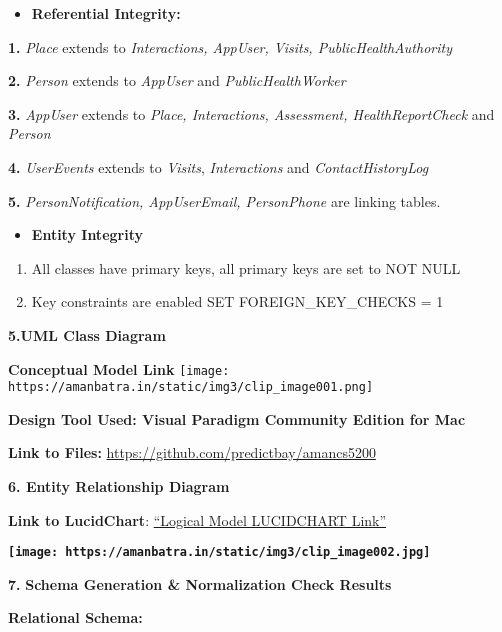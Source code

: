 \documentclass[
]{article}
\providecommand{\tightlist}{%
  \setlength{\itemsep}{0pt}\setlength{\parskip}{0pt}}
\begin{document}
\begin{itemize}
\tightlist
\item
  \textbf{Referential Integrity:}
\end{itemize}

\textbf{1.} \emph{Place} extends to \emph{Interactions, AppUser, Visits,
PublicHealthAuthority}

\textbf{2.} \emph{Person} extends to \emph{AppUser} and
\emph{PublicHealthWorker}

\textbf{3.} \emph{AppUser} extends to \emph{Place, Interactions,
Assessment, HealthReportCheck} and \emph{Person}

\textbf{4.} \emph{UserEvents} extends to \emph{Visits},
\emph{Interactions} and \emph{ContactHistoryLog}

\textbf{5.} \emph{PersonNotification, AppUserEmail, PersonPhone} are
linking tables.

\begin{itemize}
\tightlist
\item
  \textbf{Entity Integrity}
\end{itemize}

\begin{enumerate}
\def\labelenumi{\arabic{enumi}.}
\item
  All classes have primary keys, all primary keys are set to NOT NULL
\item
  Key constraints are enabled SET FOREIGN\_KEY\_CHECKS = 1
\end{enumerate}

\textbf{5.UML Class Diagram}

\textbf{Conceptual Model Link}
\texttt{[image: https://amanbatra.in/static/img3/clip\_image001.png]}

\textbf{Design Tool Used: Visual Paradigm Community Edition for Mac}

\textbf{Link to Files:} \url{https://github.com/predictbay/amancs5200}

\textbf{6. Entity Relationship Diagram}

\textbf{Link to LucidChart}:
\href{https://app.lucidchart.com/documents/view/982d3b7d-538a-4993-9511-126f0853bb6e/0_0}{``Logical
Model LUCIDCHART Link''}

\textbf{\texttt{[image: https://amanbatra.in/static/img3/clip\_image002.jpg]}}

\textbf{7.} \textbf{Schema Generation \& Normalization Check Results}

\textbf{Relational Schema:}
\end{document}
